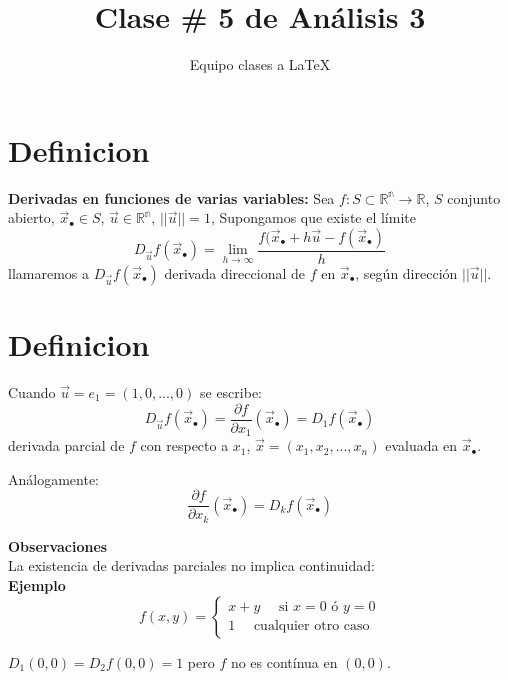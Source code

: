 \documentclass[12pt]{article}
\title{Clase \# 5 de Análisis 3}
\author{Equipo clases a \LaTeX}
\newcommand{\definicion}{\section{Definicion}}
\begin{document}
	
	\maketitle
	
	
	\definicion \textbf{Derivadas en funciones de varias variables:}
	Sea $f: S\subset \mathbb{R^n}\rightarrow \mathbb{R}$, $S$ conjunto abierto, $\vec{x}_\bullet \in S$, $\vec{u}\in \mathbb{R^n}$, $||\vec{u}||=1$, Supongamos que existe el límite 
	$$D_{\vec{u}}f(\vec{x}_\bullet)=\lim_{h\rightarrow \infty}\frac{f(\vec{x}_\bullet+h\vec{u}-f(\vec{x}_\bullet)}{h}$$
	llamaremos a $D_{\vec{u}}f(\vec{x}_\bullet)$ derivada direccional de $f$ en $\vec{x}_\bullet$, según dirección $||\vec{u}||$.
	\definicion
	Cuando $\vec{u}=e_1=(1,0,...,0)$ se escribe:
	$$D_{\vec{u}}f(\vec{x}_\bullet)=\frac{\partial f}{\partial x_1}(\vec{x}_\bullet)=D_1f(\vec{x}_\bullet)$$
	derivada parcial de $f$ con respecto a $x_1$, $\vec{x}=(x_1,x_2,...,x_n)$ evaluada en $\vec{x}_\bullet$.
	
	Análogamente:
	$$\frac{\partial f}{\partial x_k}(\vec{x}_\bullet)=D_kf(\vec{x}_\bullet)$$

	
\textbf{Observaciones}\\

La existencia de derivadas parciales no implica continuidad:\\

\textbf{Ejemplo}
$$f(x,y)=
\begin{cases}
x+y \quad \text{ si } x=0 \text{ ó } y=0\\
1  \quad \text{ cualquier otro caso }
\end{cases}$$

$D_1(0,0)=D_2f(0,0)=1$ pero $f$ no es contínua en  $(0,0)$.
\end{document}

